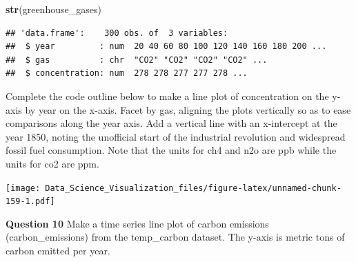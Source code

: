 \documentclass[
]{article}
\newenvironment{Shaded}{\begin{snugshade}}{\end{snugshade}}
\newcommand{\DataTypeTok}[1]{\textcolor[rgb]{0.13,0.29,0.53}{#1}}
\newcommand{\DecValTok}[1]{\textcolor[rgb]{0.00,0.00,0.81}{#1}}
\newcommand{\KeywordTok}[1]{\textcolor[rgb]{0.13,0.29,0.53}{\textbf{#1}}}
\newcommand{\NormalTok}[1]{#1}
\newcommand{\OperatorTok}[1]{\textcolor[rgb]{0.81,0.36,0.00}{\textbf{#1}}}
\newcommand{\StringTok}[1]{\textcolor[rgb]{0.31,0.60,0.02}{#1}}
\begin{document}
\begin{Shaded}
\begin{Highlighting}[]
\KeywordTok{str}\NormalTok{(greenhouse_gases)}
\end{Highlighting}
\end{Shaded}

\begin{verbatim}
## 'data.frame':    300 obs. of  3 variables:
##  $ year         : num  20 40 60 80 100 120 140 160 180 200 ...
##  $ gas          : chr  "CO2" "CO2" "CO2" "CO2" ...
##  $ concentration: num  278 278 277 277 278 ...
\end{verbatim}

Complete the code outline below to make a line plot of concentration on
the y-axis by year on the x-axis. Facet by gas, aligning the plots
vertically so as to ease comparisons along the year axis. Add a vertical
line with an x-intercept at the year 1850, noting the unofficial start
of the industrial revolution and widespread fossil fuel consumption.
Note that the units for ch4 and n2o are ppb while the units for co2 are
ppm.

\begin{Shaded}
\end{Shaded}

\texttt{[image: Data\_Science\_Visualization\_files/figure-latex/unnamed-chunk-159-1.pdf]}

\textbf{Question 10} Make a time series line plot of carbon emissions
(carbon\_emissions) from the temp\_carbon dataset. The y-axis is metric
tons of carbon emitted per year.
\end{document}
